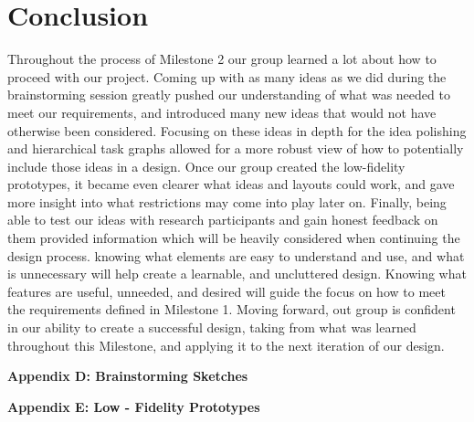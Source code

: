 \documentclass{article}
\begin{document}
\section{Conclusion}
Throughout the process of Milestone 2 our group learned a lot about how to proceed with our project. Coming up with as many ideas as we did during the brainstorming session greatly pushed our understanding of what was needed to meet our requirements, and introduced many new ideas that would not have otherwise been considered. Focusing on these ideas in depth for the idea polishing and hierarchical task graphs allowed for a more robust view of how to potentially include those ideas in a design. Once our group created the low-fidelity prototypes, it became even clearer what ideas and layouts could work, and gave more insight into what restrictions may come into play later on. Finally, being able to test our ideas with research participants and gain honest feedback on them provided information which will be heavily considered when continuing the design process. knowing what elements are easy to understand and use, and what is unnecessary will help create a learnable, and uncluttered design. Knowing what features are useful, unneeded, and desired will guide the focus on how to meet the requirements defined in Milestone 1. Moving forward, out group is confident in our ability to create a successful design, taking from what was learned throughout this Milestone, and applying it to the next iteration of our design.






%



\newpage
{} %
\vspace*{40mm}
\begin{centering}
	{\huge\bfseries Appendix D: Brainstorming Sketches}\\[0.4cm] 
\end{centering}


\newpage	
\vspace*{40mm}
\begin{centering}
	{\huge\bfseries Appendix E: Low - Fidelity Prototypes}\\[0.4cm] 
\end{centering}
\end{document}
